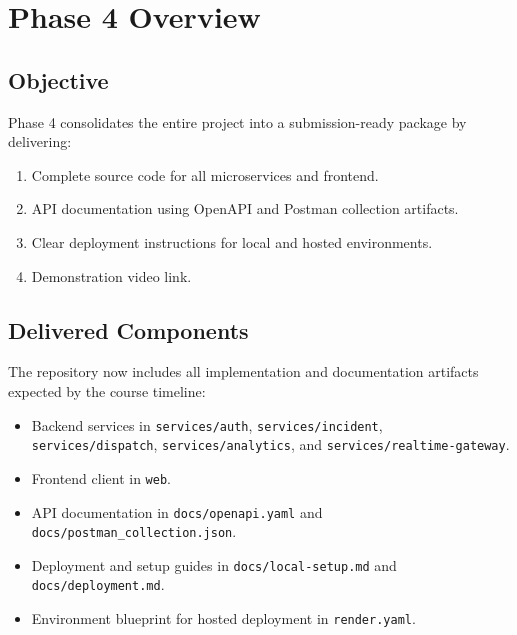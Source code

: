 \documentclass[12pt,a4paper]{report}
\begin{document}
\chapter{Phase 4 Overview}

\section{Objective}

Phase 4 consolidates the entire project into a submission-ready package by delivering:

\begin{enumerate}
	\item Complete source code for all microservices and frontend.
	\item API documentation using OpenAPI and Postman collection artifacts.
	\item Clear deployment instructions for local and hosted environments.
	\item Demonstration video link.
\end{enumerate}

\section{Delivered Components}

The repository now includes all implementation and documentation artifacts expected by the course timeline:

\begin{itemize}
	\item Backend services in \texttt{services/auth}, \texttt{services/incident}, \texttt{services/dispatch}, \texttt{services/analytics}, and \texttt{services/realtime-gateway}.
	\item Frontend client in \texttt{web}.
	\item API documentation in \texttt{docs/openapi.yaml} and \texttt{docs/postman\_collection.json}.
	\item Deployment and setup guides in \texttt{docs/local-setup.md} and \texttt{docs/deployment.md}.
	\item Environment blueprint for hosted deployment in \texttt{render.yaml}.
\end{itemize}

\newpage

\end{document}
